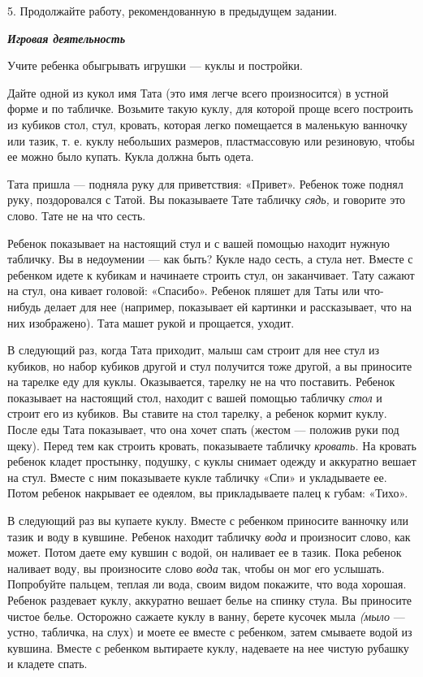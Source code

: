 \documentclass[a5paper]{book}
\renewcommand{\emph}[1]{\textit{#1}}
\begin{document}
5. Продолжайте работу, рекомендованную в предыдущем задании.

\emph{\textbf{Игровая деятельность}}

Учите ребенка обыгрывать игрушки --- куклы и постройки.

Дайте одной из кукол имя Тата (это имя легче всего произносится) в
устной форме и по табличке. Возьмите такую куклу, для которой проще
всего построить из кубиков стол, стул, кровать, которая легко помещается
в маленькую ванночку или тазик, т. е. куклу небольших размеров,
пластмассовую или резиновую, чтобы ее можно было купать. Кукла должна
быть одета.

Тата пришла --- подняла руку для приветствия: «Привет». Ребенок тоже
поднял руку, поздоровался с Татой. Вы показываете Тате табличку
\emph{сядь,} и говорите это слово. Тате не на что сесть.

Ребенок показывает на настоящий стул и с вашей помощью находит нужную
табличку. Вы в недоумении --- как быть? Кукле надо сесть, а стула нет.
Вместе с ребенком идете к кубикам и начинаете строить стул, он
заканчивает. Тату сажают на стул, она кивает головой: «Спасибо». Ребенок
пляшет для Таты или что-нибудь делает для нее (например, показывает ей
картинки и рассказывает, что на них изображено). Тата машет рукой и
прощается, уходит.

В следующий раз, когда Тата приходит, малыш сам строит для нее стул из
кубиков, но набор кубиков другой и стул получится тоже другой, а вы
приносите на тарелке еду для куклы. Оказывается, тарелку не на что
поставить. Ребенок показывает на настоящий стол, находит с вашей помощью
табличку \emph{стол} и строит его из кубиков. Вы ставите на стол
тарелку, а ребенок кормит куклу. После еды Тата показывает, что она
хочет спать (жестом --- положив руки под щеку). Перед тем как строить
кровать, показываете табличку \emph{кровать.} На кровать ребенок кладет
простынку, подушку, с куклы снимает одежду и аккуратно вешает на стул.
Вместе с ним показываете кукле табличку «Спи» и укладываете ее. Потом
ребенок накрывает ее одеялом, вы прикладываете палец к губам: «Тихо».

В следующий раз вы купаете куклу. Вместе с ребенком приносите ванночку
или тазик и воду в кувшине. Ребенок находит табличку \emph{вода} и
произносит слово, как может. Потом даете ему кувшин с водой, он наливает
ее в тазик. Пока ребенок наливает воду, вы произносите слово \emph{вода}
так, чтобы он мог его услышать. Попробуйте пальцем, теплая ли вода,
своим видом покажите, что вода хорошая. Ребенок раздевает куклу,
аккуратно вешает белье на спинку стула. Вы приносите чистое белье.
Осторожно сажаете куклу в ванну, берете кусочек мыла \emph{(мыло} ---
устно, табличка, на слух) и моете ее вместе с ребенком, затем смываете
водой из кувшина. Вместе с ребенком вытираете куклу, надеваете на нее
чистую рубашку и кладете спать.
\end{document}
